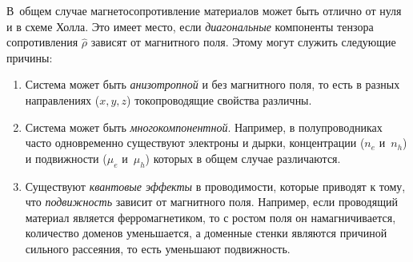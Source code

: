 В~общем случае магнетосопротивление материалов может быть отлично от нуля
и в схеме Холла. Это имеет место, если
\emph{диагональные} компоненты тензора сопротивления $\hat{\rho}$
зависят от магнитного поля. Этому могут служить следующие причины:
\begin{enumerate}
    \item Система может быть \emph{анизотропной} и без магнитного поля, то есть в разных
направлениях ($x,y,z$) токопроводящие свойства различны.

\item Система может быть \emph{многокомпонентной}. Например, в
полупроводниках часто одновременно существуют электроны и дырки, концентрации
($n_e$ и~$n_h$) и подвижности ($\mu_e$ и~$\mu_h$) которых в общем случае
различаются.

\item Существуют \emph{квантовые эффекты} в проводимости, которые приводят
к тому, что \emph{подвижность} зависит от магнитного поля. Например, если
проводящий материал является ферромагнетиком, то с ростом поля он
намагничивается, количество доменов уменьшается, а доменные стенки являются
причиной сильного рассеяния, то есть уменьшают подвижность.
\end{enumerate}

